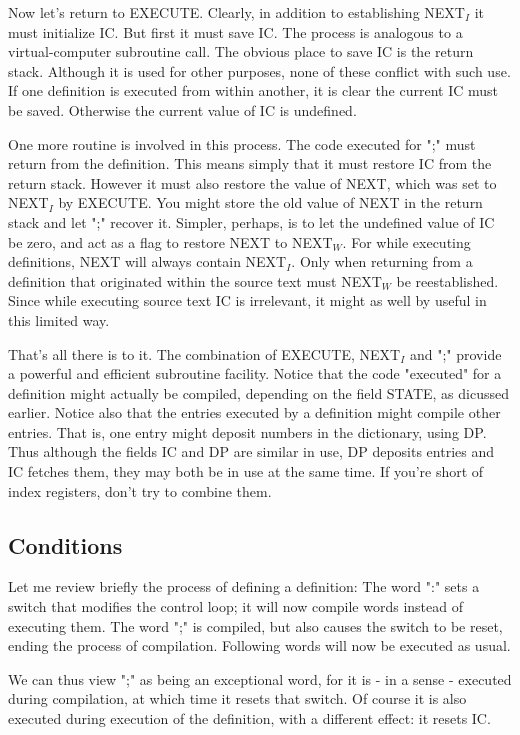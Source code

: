 \documentclass[b5paper, oneside]{book}
\begin{document}
Now let's return to EXECUTE. Clearly, in addition to establishing NEXT$_I$ it must initialize IC. But first it must save IC. The process is analogous to a virtual-computer subroutine call. The obvious place to save IC is the return stack. Although it is used for other purposes, none of these conflict with such use. If one definition is executed from within another, it is clear the current IC must be saved. Otherwise the current value of IC is undefined.

One more routine is involved in this process. The code executed for ";" must return from the definition. This means simply that it must restore IC from the return stack. However it must also restore the value of NEXT, which was set to NEXT$_I$ by EXECUTE. You might store the old value of NEXT in the return stack and let ";" recover it. Simpler, perhaps, is to let the undefined value of IC be zero, and act as a flag to restore NEXT to NEXT$_W$. For while executing definitions, NEXT will always contain NEXT$_I$. Only when returning from a definition that originated within the source text must NEXT$_W$ be reestablished. Since while executing source text IC is irrelevant, it might as well by useful in this limited way.

That's all there is to it. The combination of EXECUTE, NEXT$_I$ and ";" provide a powerful and efficient subroutine facility. Notice that the code "executed" for a definition might actually be compiled, depending on the field STATE, as dicussed earlier. Notice also that the entries executed by a definition might compile other entries. That is, one entry might deposit numbers in the dictionary, using DP. Thus although the fields IC and DP are similar in use, DP deposits entries and IC fetches them, they may both be in use at the same time. If you're short of index registers, don't try to combine them.

\subsection{Conditions}
Let me review briefly the process of defining a definition: The word ":" sets a switch that modifies the control loop; it will now compile words instead of executing them. The word ";" is compiled, but also causes the switch to be reset, ending the process of compilation. Following words will now be executed as usual.

We can thus view ";" as being an exceptional word, for it is - in a sense - executed during compilation, at which time it resets that switch. Of course it is also executed during execution of the definition, with a different effect: it resets IC.
\end{document}
